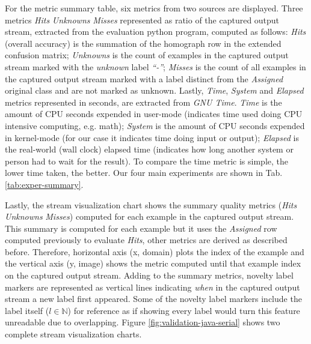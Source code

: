 For the metric summary table, six metrics from two sources are displayed.
Three metrics \emph{Hits} \emph{Unknowns} \emph{Misses} represented as ratio of the
captured output stream, extracted from the evaluation python
program, computed as follows:
\emph{Hits} (overall accuracy) is the summation of the homograph row in the
extended confusion matrix;
\emph{Unknowns} is the count of examples in the captured output stream marked
with the \emph{unknown} label \emph{``-''};
\emph{Misses} is the count of all examples in the captured output stream marked
with a label distinct from the \emph{Assigned} original class and are not marked
as unknown.
Lastly, \emph{Time}, \emph{System} and \emph{Elapsed} metrics represented in seconds,
are extracted from \emph{GNU Time}.
\emph{Time} is the amount of CPU seconds expended in user-mode
(indicates time used doing CPU intensive computing, e.g. math);
\emph{System} is the amount of CPU seconds expended in kernel-mode
(for our case it indicates time doing input or output);
\emph{Elapsed} is the real-world (wall clock) elapsed time
(indicates how long another system or person had to wait for the result).
To compare the time metric is simple, the lower time taken, the better.
Our four main experiments are shown in Tab. \ref{tab:exper-summary}.

Lastly, the stream visualization chart shows the summary quality metrics
(\emph{Hits} \emph{Unknowns} \emph{Misses})
computed for each example in the captured output stream.
This summary is computed for each example but it uses the \emph{Assigned} row
computed previously to evaluate \emph{Hits}, other metrics are derived as
described before.
Therefore, horizontal axis (x, domain) plots the index of the example and the
vertical axis (y, image) shows the metric computed until that example index on the captured
output stream.
Adding to the summary metrics, novelty label markers are represented as vertical
lines indicating \emph{when} in the captured output stream a new label first
appeared.
Some of the novelty label markers include the label itself ($l \in \mathbb{N}$)
for reference as if showing every label would turn this feature unreadable due
to overlapping.
Figure \ref{fig:validation-java-serial} shows two complete stream visualization charts.

